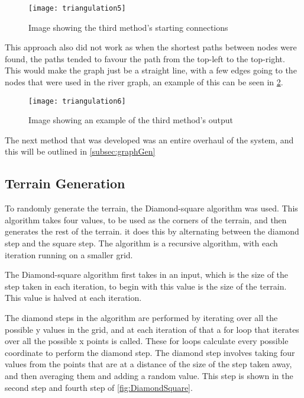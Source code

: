 \begin{figure}[H]
	\texttt{[image: triangulation5]}
	\centering
	\caption{Image showing the third method's starting connections}
	\label{fig:triangulation5}
\end{figure}
	
	This approach also did not work as when the shortest paths between nodes were found, the paths tended to favour the path from the top-left to the top-right. This would make the graph just be a straight line, with a few edges going to the nodes that were used in the river graph, an example of this can be seen in \ref{fig:triangulation6}.

\begin{figure}[H]
	\texttt{[image: triangulation6]}
	\centering
	\caption{Image showing an example of the third method's output}
	\label{fig:triangulation6}
\end{figure}

	The next method that was developed was an entire overhaul of the system, and this will be outlined in \ref{subsec:graphGen}



\subsection{Terrain Generation}
	To randomly generate the terrain, the Diamond-square algorithm was used. This algorithm takes four values, to be used as the corners of the terrain, and then generates the rest of the terrain. it does this by alternating between the diamond step and the square step. The algorithm is a recursive algorithm, with each iteration running on a smaller grid.
	\newline
	\par
	The Diamond-square algorithm first takes in an input, which is the size of the step taken in each iteration, to begin with this value is the size of the terrain. This value is halved at each iteration.
	\newline
	\par


	The diamond steps in the algorithm are performed by iterating over all the possible y values in the grid, and at each iteration of that a for loop that iterates over all the possible x points is called. These for loops calculate every possible coordinate to perform the diamond step. The diamond step involves taking four values from the points that are at a distance of the size of the step taken away, and then averaging them and adding a random value. This step is shown in the second step and fourth step of \ref{fig:DiamondSquare}.
	\newline
	\par

